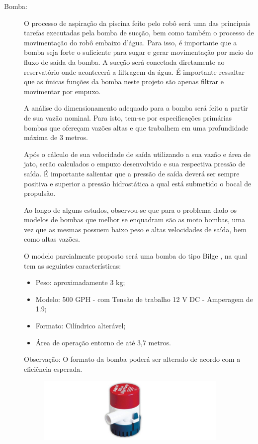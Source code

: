 \FloatBarrier
\par
\begin{description}
\item[Bomba:] O processo de aspiração da piscina feito pelo robô será uma das
principais tarefas executadas pela bomba de sucção, bem como também o processo
de movimentação do robô embaixo d’água. Para isso, é importante que a bomba
seja forte o suficiente para sugar e gerar movimentação por meio
do fluxo de saída da bomba. A sucção será conectada diretamente ao reservatório
onde acontecerá a filtragem da água. É importante ressaltar que as únicas funções
da bomba neste projeto são apenas filtrar e movimentar por empuxo.
\par
A análise do dimensionamento adequado para a bomba será feito a partir de sua vazão
nominal. Para isto, tem-se por especificações primárias bombas que ofereçam vazões
altas e que trabalhem em uma profundidade máxima de 3 metros. 
\par
Após o cálculo de sua velocidade de saída utilizando a sua vazão e área de jato,
serão calculados o empuxo desenvolvido e sua respectiva pressão de saída. É importante
salientar que a pressão de saída deverá ser sempre positiva e superior a pressão
hidrostática a qual está submetido o bocal de propulsão.
\par
Ao longo de alguns estudos, observou-se que para o problema dado os modelos de bombas
que melhor se enquadram são as moto bombas, uma vez que as mesmas possuem baixo peso e
altas velocidades de saída, bem como altas vazões.
\par
O modelo parcialmente proposto será uma bomba do tipo Bilge , na qual tem as seguintes
características:
  \begin{itemize}
  \item Peso: aproximadamente 3 kg;
  \item Modelo: 500 GPH - com Tensão de trabalho 12 V DC - Amperagem de 1.9;
  \item Formato: Cilíndrico alterável;
  \item Área de operação entorno de até 3,7 metros.
  \end{itemize}
Observação: O formato da bomba poderá ser alterado de acordo com a eficiência
esperada.
\par
\begin{figure}[h]
  \centering
  \includegraphics[width=0.9\textwidth]{figures/waterbomb.png}

\end{figure}
\end{description}
